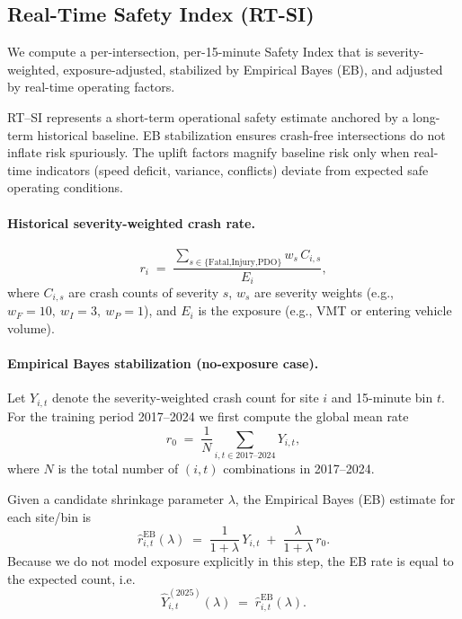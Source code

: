 \documentclass[conference]{IEEEtran}
\begin{document}
\subsection{Real-Time Safety Index (RT-SI)}
We compute a per-intersection, per-15-minute Safety Index that is severity-weighted, exposure-adjusted, stabilized by Empirical Bayes (EB), and adjusted by real-time operating factors.

RT–SI represents a short-term operational safety estimate anchored by a long-term historical baseline. EB stabilization ensures crash-free intersections do not inflate risk spuriously. The uplift factors magnify baseline risk only when real-time indicators (speed deficit, variance, conflicts) deviate from expected safe operating conditions.

\paragraph{Historical severity-weighted crash rate.}
\begin{equation}
r_i \;=\; \frac{\sum_{s\in\{\text{Fatal,Injury,PDO}\}} w_s\,C_{i,s}}{E_i},
\end{equation}
where $C_{i,s}$ are crash counts of severity $s$, $w_s$ are severity weights (e.g., $w_F{=}10,\ w_I{=}3,\ w_P{=}1$), and $E_i$ is the exposure (e.g., VMT or entering vehicle volume).

\paragraph{Empirical Bayes stabilization (no-exposure case).}
Let $Y_{i,t}$ denote the severity-weighted crash count for site $i$ and
15-minute bin $t$. For the training period 2017--2024 we first compute the
global mean rate
\begin{equation}
r_0 \;=\; \frac{1}{N} \sum_{i,t \in \text{2017--2024}} Y_{i,t},
\end{equation}
where $N$ is the total number of $(i,t)$ combinations in 2017--2024.

Given a candidate shrinkage parameter $\lambda$, the Empirical Bayes (EB)
estimate for each site/bin is
\begin{equation}
\hat r^{\text{EB}}_{i,t}(\lambda)
\;=\;
\frac{1}{1+\lambda}\,Y_{i,t}
\;+\;
\frac{\lambda}{1+\lambda}\,r_0.
\end{equation}
Because we do not model exposure explicitly in this step, the EB rate is equal
to the expected count, i.e.
\begin{equation}
\hat Y_{i,t}^{(2025)}(\lambda)
\;=\;
\hat r^{\text{EB}}_{i,t}(\lambda).
\end{equation}
\end{document}
